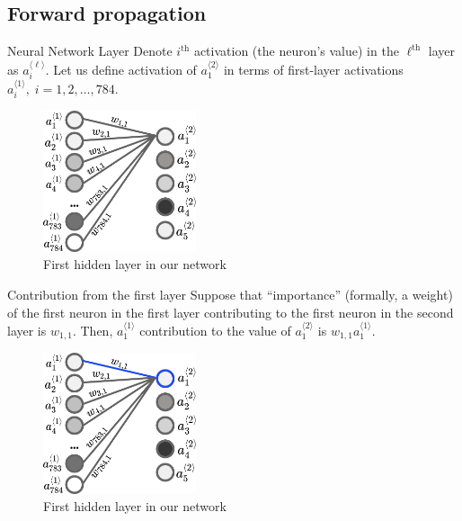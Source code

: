 \documentclass{beamer}
\begin{document}
    \subsection{Forward propagation}
    \begin{frame}{Neural Network Layer}
        Denote $i^{\text{th}}$ activation (the neuron's value) in the $\ell^{\text{th}}$ layer as $a^{\langle \ell\rangle}_i$. Let us define activation of $a^{\langle 2\rangle}_1$ in terms of first-layer activations $a^{\langle 1 \rangle}_i, \; i = 1,2,\dots,784$. 
    
        \begin{figure}
        \centering
            \includegraphics[width=0.4\textwidth]{images/presentation/layer.png}
            \caption{First hidden layer in our network}
        \end{figure}
    \end{frame}

    \begin{frame}{Contribution from the first layer}
        Suppose that ``importance'' (formally, a weight) of the first neuron in the first layer contributing to the first neuron in the second layer is $w_{1,1}$. Then, $a_1^{\langle 1 \rangle}$ contribution to the value of $a_1^{\langle 2\rangle}$ is $w_{1,1}a_1^{\langle 1 \rangle}$. 
    
        \begin{figure}
        \centering
            \includegraphics[width=0.4\textwidth]{images/presentation/layer_first_selected.png}
            \caption{First hidden layer in our network}
        \end{figure}
    \end{frame}
\end{document}

